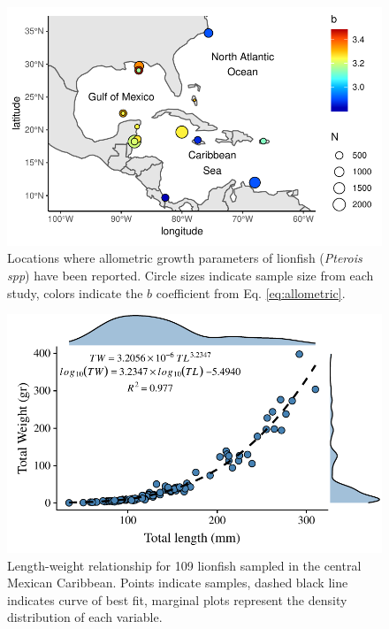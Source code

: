 \documentclass[12pt,]{article}
\theoremstyle{definition}
\theoremstyle{definition}
\theoremstyle{definition}
\theoremstyle{remark}
\begin{document}
\begin{figure}
\centering
\includegraphics{Manuscript_files/figure-latex/unnamed-chunk-8-1.pdf}
\caption{\label{fig:unnamed-chunk-8}\label{fig:map}Locations where
allometric growth parameters of lionfish (\emph{Pterois spp}) have been
reported. Circle sizes indicate sample size from each study, colors
indicate the \(b\) coefficient from Eq. \ref{eq:allometric}.}
\end{figure}

\begin{figure}
\centering
\includegraphics{Manuscript_files/figure-latex/unnamed-chunk-9-1.pdf}
\caption{\label{fig:unnamed-chunk-9}\label{fig:l-w-carib}Length-weight
relationship for 109 lionfish sampled in the central Mexican Caribbean.
Points indicate samples, dashed black line indicates curve of best fit,
marginal plots represent the density distribution of each variable.}
\end{figure}
\end{document}
